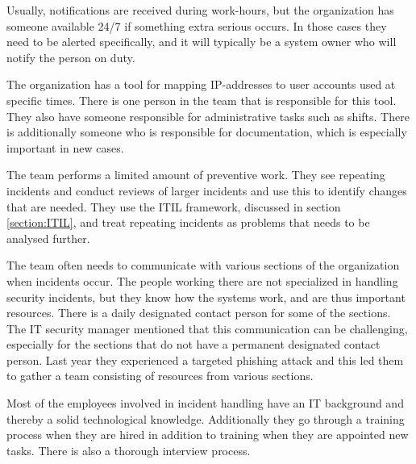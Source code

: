 Usually, notifications are received during work-hours, but the organization has someone available 24/7 if something extra serious occurs. In those cases they need to be alerted specifically, and it will typically be a system owner who will notify the person on duty.

The organization has a tool for mapping IP-addresses to user accounts used at specific times. There is one person in the team that is responsible for this tool. They also have someone responsible for administrative tasks such as shifts. There is additionally someone who is responsible for documentation, which is especially important in new cases.

The team performs a limited amount of preventive work. They see repeating incidents and conduct reviews of larger incidents and use this to identify changes that are needed. They use the \ac{ITIL} framework, discussed in section \ref{section:ITIL}, and treat repeating incidents as problems that needs to be analysed further.

The team often needs to communicate with various sections of the organization when incidents occur. The people working there are not specialized in handling security incidents, but they know how the systems work, and are thus important resources. There is a daily designated contact person for some of the sections. The IT security manager mentioned that this communication can be challenging, especially for the sections that do not have a permanent designated contact person. Last year they experienced a targeted phishing attack and this led them to gather a team consisting of resources from various sections.

Most of the employees involved in incident handling have an IT background and thereby a solid technological knowledge. Additionally they go through a training process when they are hired in addition to training when they are appointed new tasks. There is also a thorough interview process.

